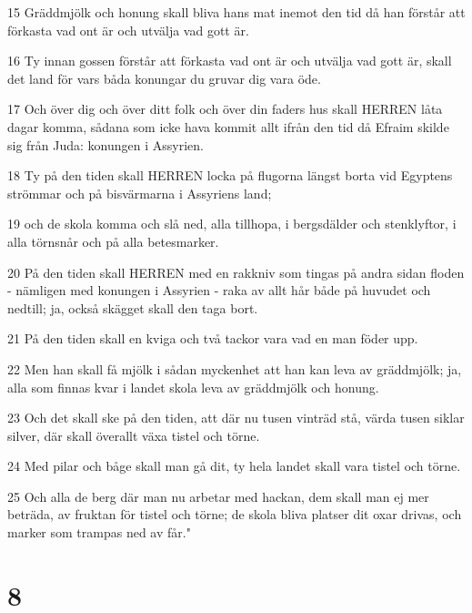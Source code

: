 \par 15 Gräddmjölk och honung skall bliva hans mat inemot den tid då han förstår att förkasta vad ont är och utvälja vad gott är.
\par 16 Ty innan gossen förstår att förkasta vad ont är och utvälja vad gott är, skall det land för vars båda konungar du gruvar dig vara öde.
\par 17 Och över dig och över ditt folk och över din faders hus skall HERREN låta dagar komma, sådana som icke hava kommit allt ifrån den tid då Efraim skilde sig från Juda: konungen i Assyrien.
\par 18 Ty på den tiden skall HERREN locka på flugorna längst borta vid Egyptens strömmar och på bisvärmarna i Assyriens land;
\par 19 och de skola komma och slå ned, alla tillhopa, i bergsdälder och stenklyftor, i alla törnsnår och på alla betesmarker.
\par 20 På den tiden skall HERREN med en rakkniv som tingas på andra sidan floden - nämligen med konungen i Assyrien - raka av allt hår både på huvudet och nedtill; ja, också skägget skall den taga bort.
\par 21 På den tiden skall en kviga och två tackor vara vad en man föder upp.
\par 22 Men han skall få mjölk i sådan myckenhet att han kan leva av gräddmjölk; ja, alla som finnas kvar i landet skola leva av gräddmjölk och honung.
\par 23 Och det skall ske på den tiden, att där nu tusen vinträd stå, värda tusen siklar silver, där skall överallt växa tistel och törne.
\par 24 Med pilar och båge skall man gå dit, ty hela landet skall vara tistel och törne.
\par 25 Och alla de berg där man nu arbetar med hackan, dem skall man ej mer beträda, av fruktan för tistel och törne; de skola bliva platser dit oxar drivas, och marker som trampas ned av får."

\chapter{8}


